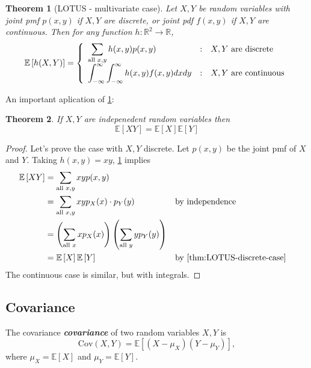 \documentclass[10pt]{article}
\newtheorem{theorem}{Theorem}
\theoremstyle{definition}
\newcommand{\1}[1]{\textbf{1}_{\left[#1\right]}} %
\def\R{\mathbb{R}} %
\def\E{\mathbb{E}} %
\DeclareRobustCommand{\demph}[1]{%
  \ifmmode
  {\color{Blue}#1}%
  \else
  {\color{Blue}\bfseries\slshape #1}%
  \fi
}
\begin{document}
\begin{theorem}[LOTUS - multivariate case]
  \label{thm:LOTUS-multivariate-case}
  Let $X,Y$ be random variables with joint pmf $p(x,y)$ if $X,Y$ are discrete,
  or joint pdf $f(x,y)$ if $X,Y$ are continuous. Then for any function
  $h:\R^{2} \to \R$,
  \begin{equation*}
    \E\left[h(X,Y) \right] =\left\{ \begin{array}{l@{\quad:\quad}l}
        \displaystyle\sum_{\text{all }x,y} h(x,y)p(x,y) & \text{$X,Y$ are discrete}\\
        \displaystyle \int_{-\infty}^{\infty}\int_{-\infty}^{\infty}h(x,y)f(x,y)dxdy   & \text{$X,Y$ are continuous}
      \end{array}\right.
  \end{equation*}
\end{theorem}

An important aplication of \cref{thm:LOTUS-multivariate-case}:

\begin{theorem}
  \label{thm:independent-expectations-factorize}
  If $X,Y$ are indepenedent random variables then
  \begin{equation*}
    \E\left[XY \right] = \E\left[X \right] \E\left[Y \right]
  \end{equation*}
\end{theorem}
\begin{proof}
  Let's prove the case with $X,Y$ discrete. Let $p(x,y)$ be the joint pmf of
  $X$ and $Y$. Taking $h(x,y) = xy$, \cref{thm:LOTUS-multivariate-case} implies
  \begin{align*}
    \E\left[XY \right] 
    &= \sum_{\text{all }x,y} xyp(x,y)\\
    &= \sum_{\text{all }x,y} xyp_{X}(x) \cdot p_{Y}(y) &&\text{by independence}\\
    &= \left( \sum_{\text{all }x} xp_{X}(x) \right) \left( \sum_{\text{all }y}yp_{Y}(y)  \right)\\   
    &= \E\left[X \right] \E\left[Y \right] &&\text{by \cref{thm:LOTUS-discrete-case}}
  \end{align*}
  The continuous case is similar, but with integrals.
\end{proof}

\subsection{Covariance}

The \demph{covariance} of two random variables $X,Y$ is
\begin{equation*}
  \text{Cov}(X,Y) = \E\left[(X-\mu_{X})(Y-\mu_{Y}) \right],
\end{equation*}
where $\mu_{X} = \E[X]$ and $\mu_{Y}=\E[Y]$.
\end{document}
